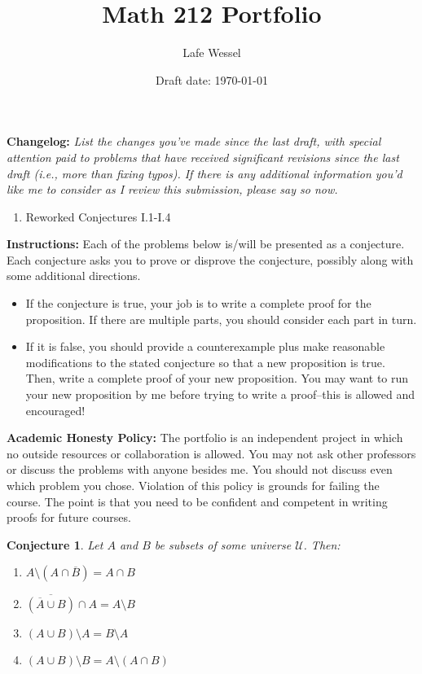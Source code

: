 \documentclass[11pt,titlepage]{article}		%
\title{\sc Math 212 Portfolio}
\author{Lafe Wessel}
\date{Draft date: \today}
\theoremstyle{theorem}
\newtheorem{conjecture}[theorem]{Conjecture}
\begin{document}
\maketitle


\noindent\textbf{Changelog:} \emph{List the changes you've made since the last draft, with special attention paid to problems that have received significant revisions since the last draft (i.e., more than fixing typos). If there is any additional information you'd like me to consider as I review this submission, please say so now.}

\begin{enumerate}
\item Reworked Conjectures I.1-I.4
\end{enumerate}

\noindent\textbf{Instructions:} Each of the problems below is/will be presented as a conjecture. Each conjecture asks you to prove or disprove the conjecture, possibly along with some additional directions. 

\bigskip

\begin{itemize}  
	\item If the conjecture is true, your job is to write a complete proof for the proposition. If there are multiple parts, you should consider each part in turn.
	\item If it is false, you should provide a counterexample plus make reasonable modifications to the stated conjecture so that a new proposition is true. Then, write a complete proof of your new proposition. You may want to run your new proposition by me before trying to write a proof--this is allowed and encouraged!
\end{itemize}


\noindent\textbf{Academic Honesty Policy:}
The portfolio is an independent project in which no outside resources or collaboration is allowed. You may not ask other professors or discuss the problems with anyone besides me. You should not discuss even which problem you chose. Violation of this policy is grounds for failing the course. The point is that you need to be confident and competent in writing proofs for future courses.






\clearpage

\begin{conjecture}
	Let $A$ and $B$ be subsets of some universe $\mathcal{U}$.
	Then:
	\begin{enumerate}
		\item $A\setminus (A\cap \overline{B}) = A\cap B$
		\item $\overline{(\overline{A}\cup B)} \cap A = A\setminus B$
		\item $(A\cup B)\setminus A = B\setminus A$
		\item $(A\cup B) \setminus B = A\setminus (A\cap B)$
	\end{enumerate}
\end{conjecture}
\end{document}
